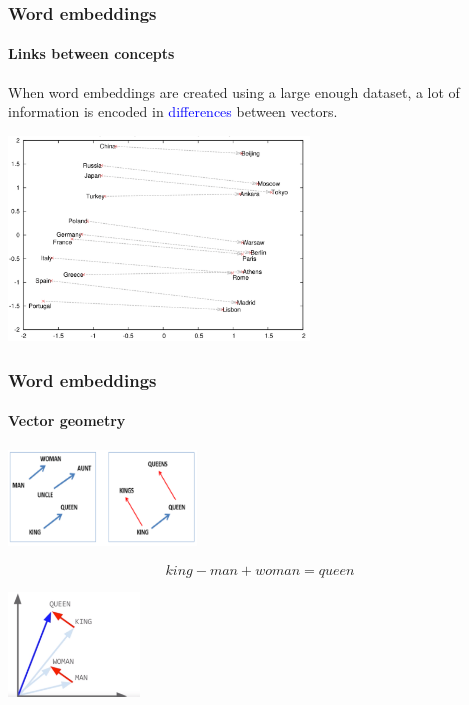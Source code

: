 \documentclass[9pt]{beamer}
\begin{document}
\begin{frame}
  \frametitle{Word embeddings}

  \framesubtitle{Links between concepts}

  When word embeddings are created using a large enough dataset, a lot
  of information is encoded in \textcolor{blue}{differences} between
  vectors.

  \begin{center}
    \includegraphics[width = 8cm]{images/word_embeddings_3.png}
  \end{center}
\end{frame}

\begin{frame}
  \frametitle{Word embeddings}

  \framesubtitle{Vector geometry}

  \begin{center}
    \includegraphics[width = 5cm]{images/word_embeddings_2.png}
  \end{center}
  \[
  king - man + woman = queen
  \]
  \begin{center}
    \includegraphics[width = 3.5cm]{images/king_queen.png}
  \end{center}
\end{frame}
\end{document}
